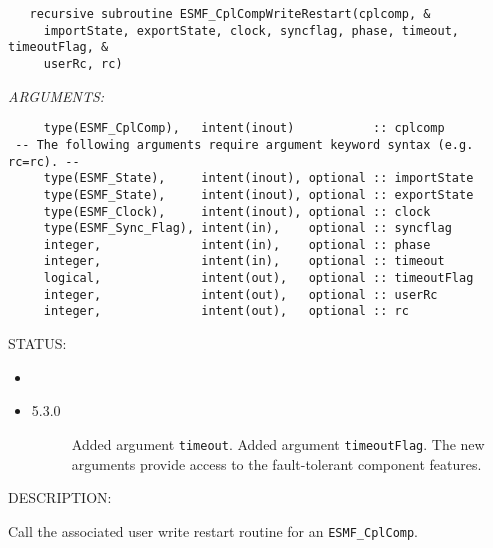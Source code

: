  
\begin{verbatim}   recursive subroutine ESMF_CplCompWriteRestart(cplcomp, &
     importState, exportState, clock, syncflag, phase, timeout, timeoutFlag, &
     userRc, rc)\end{verbatim}{\em ARGUMENTS:}
\begin{verbatim}     type(ESMF_CplComp),   intent(inout)           :: cplcomp
 -- The following arguments require argument keyword syntax (e.g. rc=rc). --
     type(ESMF_State),     intent(inout), optional :: importState
     type(ESMF_State),     intent(inout), optional :: exportState
     type(ESMF_Clock),     intent(inout), optional :: clock
     type(ESMF_Sync_Flag), intent(in),    optional :: syncflag
     integer,              intent(in),    optional :: phase
     integer,              intent(in),    optional :: timeout
     logical,              intent(out),   optional :: timeoutFlag
     integer,              intent(out),   optional :: userRc
     integer,              intent(out),   optional :: rc\end{verbatim}
{\sf STATUS:}
   \begin{itemize}
   \item{}
   \item{}
   \begin{description}
   \item[5.3.0] Added argument {\tt timeout}.
                Added argument {\tt timeoutFlag}.
                The new arguments provide access to the fault-tolerant component
                features.
   \end{description}
   \end{itemize}
  
{\sf DESCRIPTION:\\ }


   Call the associated user write restart routine for
   an {\tt ESMF\_CplComp}.
  
